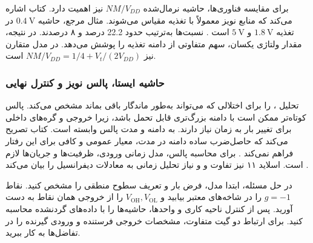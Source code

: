 برای مقایسه فناوری‌ها، حاشیه نرمال‌شده
\(NM/V_{DD}\) نیز اهمیت دارد. کتاب اشاره می‌کند که منابع
نویز معمولاً با تغذیه مقیاس می‌شوند. مثال مرجع، حاشیه
\(\qty{0.4}{\volt}\) در تغذیه \(\qty{1.8}{\volt}\) و
\(\qty{5}{\volt}\) است \cite[صفحه ۹۲]{weste}.
نسبت‌ها به‌ترتیب حدود \num{22.2} درصد و ۸ درصدند.
در نتیجه، مقدار ولتاژی یکسان، سهم متفاوتی از دامنه تغذیه را
پوشش می‌دهد. در مدل متقارن نیز
\(NM/V_{DD}=1/4+V_t/(2V_{DD})\) است.

\subsubsection{حاشیه ایستا، پالس نویز و کنترل نهایی}
\label{sec:noise-static-dynamic}
تحلیل ،  را برای اختلالی
که می‌تواند به‌طور ماندگار باقی بماند مشخص می‌کند.
پالس کوتاه‌تر ممکن است با دامنه بزرگ‌تری قابل تحمل باشد، زیرا
خروجی و گره‌های داخلی برای تغییر بار به زمان نیاز دارند.
 به دامنه و مدت پالس وابسته است.
کتاب تصریح می‌کند که حاصل‌ضرب ساده دامنه در مدت، معیار عمومی
و کافی برای این رفتار فراهم نمی‌کند
\cite[پایان بخش ، صفحه ۹۲]{weste}.
برای محاسبه پالس، مدل زمانی ورودی، ظرفیت‌ها و جریان‌ها لازم است.
اسلاید ۱۱ نیز تفاوت  و 
و نیاز تحلیل زمانی به معادلات دیفرانسیل را بیان می‌کند
\cite{dcslides}.

در حل مسئله، ابتدا مدل، فرض بار و تعریف سطوح منطقی را مشخص
کنید. نقاط \(g=-1\) را در شاخه‌های معتبر بیابید و
\(V_{\mathrm{OH}},V_{\mathrm{OL}}\) را از خروجی همان نقاط
به دست آورید. پس از کنترل ناحیه کاری و واحدها، حاشیه‌ها را
با داده‌های گردنشده محاسبه کنید. برای ارتباط دو گیت متفاوت،
مشخصات خروجی فرستنده و ورودی گیرنده را در تفاضل‌ها به کار ببرید.
